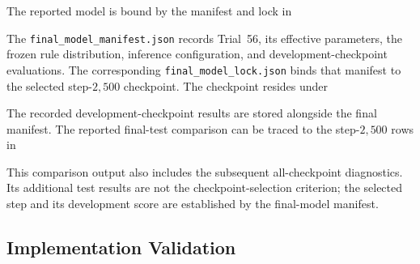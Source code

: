 \documentclass{article}
\begin{document}
The reported model is bound by the manifest and lock in
\begin{quote}
\small\raggedright
{}
\end{quote}
The \texttt{final\_model\_manifest.json} records Trial~56, its effective
parameters, the frozen rule distribution, inference configuration, and
development-checkpoint evaluations. The corresponding
\texttt{final\_model\_lock.json} binds that manifest to the selected
step-\(2{,}500\) checkpoint. The checkpoint resides under
\begin{quote}
\small\raggedright
{}
\end{quote}

The recorded development-checkpoint results are stored alongside the final
manifest. The reported final-test comparison can be traced to the
step-\(2{,}500\) rows in
\begin{quote}
\small\raggedright
{}
\end{quote}
This comparison output also includes the subsequent all-checkpoint
diagnostics. Its additional test results are not the checkpoint-selection
criterion; the selected step and its development score are established by
the final-model manifest.

\subsection{Implementation Validation}
\end{document}
